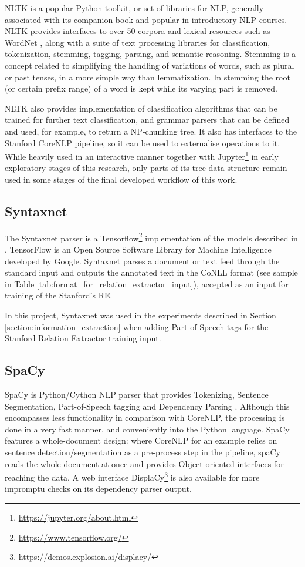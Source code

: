\documentclass[11pt,a4paper,openright]{memoir}
\begin{document}
NLTK \cite{BirdKleinLoper09} is a popular Python toolkit, or set of libraries for NLP, generally associated with its companion book and popular in introductory NLP courses. NLTK provides interfaces to over 50 corpora and lexical resources such as WordNet \cite{Miller:1995:WLD:219717.219748}, along with a suite of text processing libraries for classification, tokenization, stemming, tagging, parsing, and semantic reasoning. Stemming is a concept related to simplifying the handling of variations of words, such as plural or past tenses, in a more simple way than lemmatization. In stemming the root (or certain prefix range) of a word is kept while its varying part is removed.

NLTK also provides implementation of classification algorithms that can be trained for further text classification, and grammar parsers that can be defined and used, for example, to return a NP-chunking tree. It also has interfaces to the Stanford CoreNLP pipeline, so it can be used to externalise operations to it. While heavily used in an interactive manner together with Jupyter\footnote{\url{https://jupyter.org/about.html}} in early exploratory stages of this research, only parts of its tree data structure remain used in some stages of the final developed workflow of this work.

\subsection{Syntaxnet}

The Syntaxnet parser \cite{google-syntaxnet} is a Tensorflow\footnote{\url{https://www.tensorflow.org/}} implementation of the models described in \cite{DBLP:journals/corr/AndorAWSPGPC16}. TensorFlow is an Open Source Software Library for Machine Intelligence developed by Google. Syntaxnet parses a document or text feed through the standard input and outputs the annotated text in the CoNLL format (see sample in Table \ref{tab:format_for_relation_extractor_input}), accepted as an input for training of the Stanford's RE.

In this project, Syntaxnet was used in the experiments described in Section \ref{section:information_extraction} when adding Part-of-Speech tags for the Stanford Relation Extractor training input.


\subsection{SpaCy}

SpaCy \cite{spacy} is Python/Cython NLP parser that provides Tokenizing, Sentence Segmentation, Part-of-Speech tagging and Dependency Parsing \cite{honnibal-johnson:2015:EMNLP}. Although this encompasses less functionality in comparison with CoreNLP, the processing is done in a very fast manner, and conveniently into the Python language. SpaCy features a whole-document design: where CoreNLP for an example relies on sentence detection/segmentation as a pre-process step in the pipeline, spaCy reads the whole document at once and provides Object-oriented interfaces for reaching the data. A web interface DisplaCy\footnote{\url{https://demos.explosion.ai/displacy/}} is also available for more impromptu checks on its dependency parser output.
\end{document}
